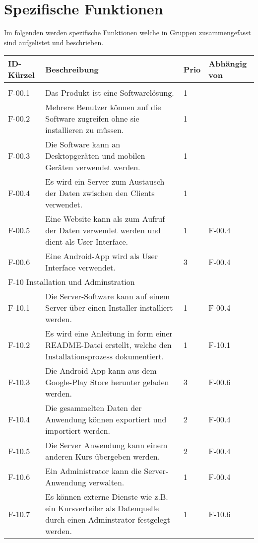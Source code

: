 \newpage
\section{Spezifische Funktionen}
Im folgenden werden spezifische Funktionen welche in Gruppen zusammengefasst sind aufgelistet und beschrieben.
\begin{tabularx}{\textwidth}{|l|X|l|l|}
    \toprule
    \textbf{ID-Kürzel} & \textbf{Beschreibung} & \textbf{Prio} & \textbf{Abhängig von} \\
    \midrule
    \endhead
    \hline
    \caption{Funktionen}
    \endfoot
    \multicolumn{4}{|l|}{F-00 Allgemein}\\
    \hline
    F-00.1 & Das Produkt ist eine Softwarelösung. & 1 & \\
    F-00.2 & Mehrere Benutzer können auf die Software zugreifen ohne sie installieren zu müssen. & 1 & \\
    F-00.3 & Die Software kann an Desktopgeräten und mobilen Geräten verwendet werden. & 1 & \\
    F-00.4 & Es wird ein Server zum Austausch der Daten zwischen den Clients verwendet. & 1 & \\
    F-00.5 & Eine Website kann als zum Aufruf der Daten verwendet werden und dient als User Interface. & 1 & F-00.4\\
    F-00.6 & Eine Android-App wird als User Interface verwendet. & 3 & F-00.4\\
    \hline
    \multicolumn{4}{|l|}{F-10 Installation und Adminstration}\\
    \hline
    F-10.1 & Die Server-Software kann auf einem Server über einen Installer installiert werden. & 1 & F-00.4 \\
    F-10.2 & Es wird eine Anleitung in form einer README-Datei erstellt, welche den Installationsprozess dokumentiert. & 1 & F-10.1\\
    F-10.3 & Die Android-App kann aus dem Google-Play Store herunter geladen werden. & 3 & F-00.6\\
    F-10.4 & Die gesammelten Daten der Anwendung können exportiert und importiert werden. & 2 & F-00.4\\
    F-10.5 & Die Server Anwendung kann einem anderen Kurs übergeben werden. & 2 & F-00.4\\
    F-10.6 & Ein Administrator kann die Server-Anwendung verwalten. & 1 & F-00.4\\
    F-10.7 & Es können externe Dienste wie z.B. ein Kursverteiler als Datenquelle durch einen Adminstrator festgelegt werden. & 1 & F-10.6\\

\end{tabularx}
